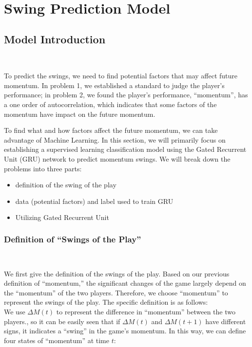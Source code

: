 \section{Swing Prediction Model}

\subsection{Model Introduction}~{}

To predict the swings, we need to find potential factors that may affect future momentum.
In problem 1, we established a standard to judge the player's performance;
in problem 2, we found the player's performance, ``momentum'', has a one order of autocorrelation,
which indicates that some factors of the momentum have impact on the future momentum.

To find what and how factors affect the future momentum, we can take advantage 
of Machine Learning. In this section, we will primarily focus on establishing a 
supervised learning classification model using the Gated Recurrent Unit (GRU) network to 
predict momentum swings. We will break down the problems into three parts:

\begin{itemize}
    \item definition of the swing of the play
    \item data (potential factors) and label used to train GRU
    \item Utilizing Gated Recurrent Unit
\end{itemize}

\subsubsection{Definition of ``Swings of the Play''}~{}

We first give the definition of the swings of the play.
Based on our previous definition of ``momentum,'' the significant changes of the game 
largely depend on the ``momentum'' of the two players. Therefore, we choose ``momentum'' to represent 
the swings of the play. The specific definition is as follows:\\

We use $\Delta M(t)$ to represent the difference in ``momentum'' between the two players., 
so it can be easily seen that if $\Delta M(t)$ and $\Delta M(t+1)$
have different signs, it indicates a ``swing'' in the game's momentum. 
In this way, we can define four states of ``momentum'' at time $t$:

